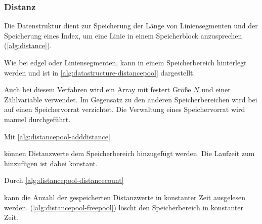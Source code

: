 \subsubsection{Distanz} %
\label{sub:distanz}

Die Datenstruktur  dient zur Speicherung der Länge von Liniensegmenten und der Speicherung eines
 Index, um eine Linie in einem Speicherblock anzusprechen (\autoref{alg:distance}).


Wie bei \gls{edgel} oder Liniensegmenten, kann  in einem Speicherbereich hinterlegt werden und ist
 in \autoref{alg:datastructure-distancepool} dargestellt.

Auch bei diesem Verfahren wird ein Array mit festert Größe $N$ und einer Zählvariable verwendet. Im Gegensatz zu den
 anderen Speicherbereichen wird bei  auf einen Speichervorrat verzichtet. Die Verwaltung eines
 Speichervorrat wird manuel durchgeführt.

% 
% 

Mit \autoref{alg:distancepool-adddistance}

können Distanzwerte dem Speicherbereich hinzugefügt werden. Die Laufzeit zum hinzufügen ist dabei
 konstant.

Durch \autoref{alg:distancepool-distancecount}

 kann die Anzahl der gespeicherten Distanzwerte in konstanter Zeit ausgelesen werden. 
(\autoref{alg:distancepool-freepool}) löscht den Speicherbereich in konstanter Zeit.


